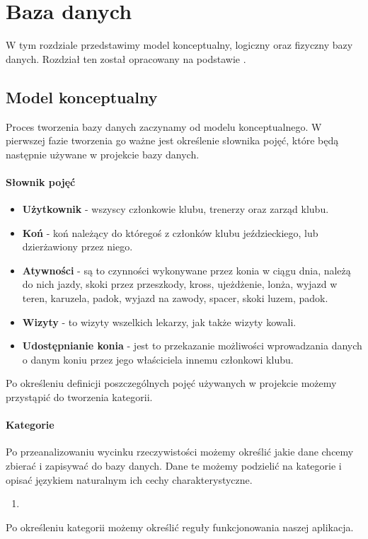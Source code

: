 \documentclass[12pt,twoside]{report}
\begin{document}
\chapter{Baza danych}
W tym rozdziale przedstawimy model konceptualny, logiczny oraz fizyczny bazy danych. Rozdział ten został opracowany na podstawie \cite{bazydanych}.
\section{Model konceptualny}
Proces tworzenia bazy danych zaczynamy od modelu konceptualnego. W pierwszej fazie tworzenia go ważne jest określenie słownika pojęć, które będą następnie używane w projekcie bazy danych.
\subsubsection{Słownik pojęć}
\begin{itemize}
	\item \textbf{Użytkownik} - wszyscy członkowie klubu, trenerzy oraz zarząd klubu.
	\item \textbf{Koń} - koń należący do któregoś z członków klubu jeździeckiego, lub dzierżawiony przez niego.
	\item \textbf{Atywności} - są to czynności wykonywane przez konia w ciągu dnia, należą do nich jazdy, skoki przez przeszkody, kross, ujeżdżenie, lonża, wyjazd w teren, karuzela, padok, wyjazd na zawody, spacer, skoki luzem, padok.
	\item \textbf{Wizyty} - to wizyty wszelkich lekarzy, jak także wizyty kowali.
	\item \textbf{Udostępnianie konia} - jest to przekazanie możliwości wprowadzania danych o danym koniu przez jego właściciela innemu członkowi klubu.
	
\end{itemize}
\newpage
Po określeniu definicji poszczególnych pojęć używanych w projekcie możemy przystąpić do tworzenia kategorii.
\subsubsection{Kategorie}
Po przeanalizowaniu wycinku rzeczywistości możemy określić jakie dane chcemy zbierać i zapisywać do bazy danych. Dane te możemy podzielić na kategorie i opisać językiem naturalnym ich cechy charakterystyczne.
\begin{enumerate}[start=1,label={\bfseries KAT:\arabic*}]
	\item 
\end{enumerate}
\newpage
Po określeniu kategorii możemy określić reguły funkcjonowania naszej aplikacja.
\end{document}
